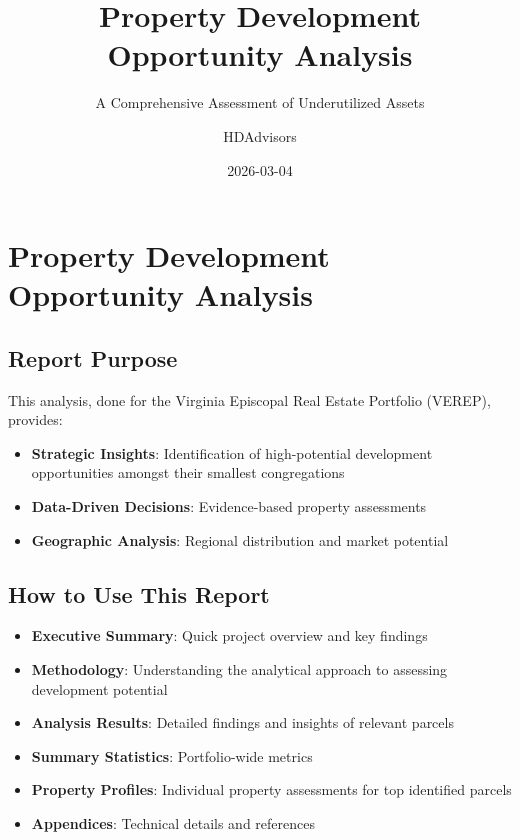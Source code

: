 \documentclass[
  letterpaper,
  DIV=11,
  numbers=noendperiod,
  oneside]{scrreprt}
\title{Property Development Opportunity Analysis}
\subtitle{A Comprehensive Assessment of Underutilized Assets}
\author{HDAdvisors}
\date{2026-03-04}
\providecommand{\tightlist}{%
  \setlength{\itemsep}{0pt}\setlength{\parskip}{0pt}}
\renewcommand*\contentsname{Table of contents}
\newcommand\contentsname{Table of contents}
\begin{document}
\maketitle

\renewcommand*\contentsname{Contents}
{
\hypersetup{linkcolor=}
\setcounter{tocdepth}{2}
\tableofcontents
}


\chapter{Property Development Opportunity
Analysis}\label{property-development-opportunity-analysis}

\section{Report Purpose}\label{report-purpose}

This analysis, done for the Virginia Episcopal Real Estate Portfolio
(VEREP), provides:

\begin{itemize}
\tightlist
\item
  \textbf{Strategic Insights}: Identification of high-potential
  development opportunities amongst their smallest congregations
\item
  \textbf{Data-Driven Decisions}: Evidence-based property assessments
\item
  \textbf{Geographic Analysis}: Regional distribution and market
  potential
\end{itemize}

\section{How to Use This Report}\label{how-to-use-this-report}

\begin{itemize}
\tightlist
\item
  \textbf{Executive Summary}: Quick project overview and key findings
\item
  \textbf{Methodology}: Understanding the analytical approach to
  assessing development potential
\item
  \textbf{Analysis Results}: Detailed findings and insights of relevant
  parcels
\item
  \textbf{Summary Statistics}: Portfolio-wide metrics
\item
  \textbf{Property Profiles}: Individual property assessments for top
  identified parcels
\item
  \textbf{Appendices}: Technical details and references
\end{itemize}
\end{document}
